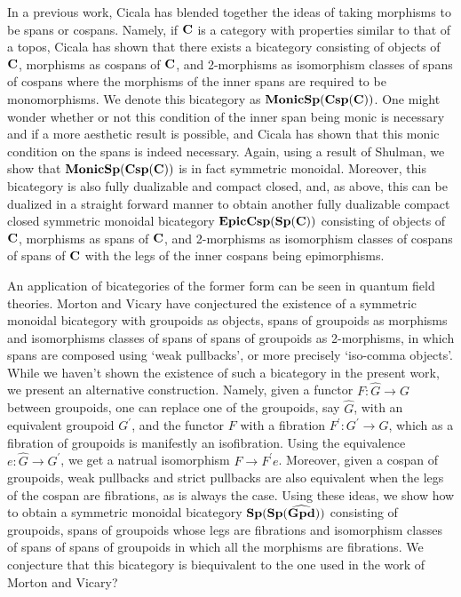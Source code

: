 \documentclass[11pt]{amsart}
\theoremstyle{remark}
\theoremstyle{definition}
\begin{document}
In a previous work, Cicala \cite{Cic} has blended together the ideas of taking morphisms to be spans or cospans. Namely, if $\bold{C}$ is a category with properties similar to that of a topos, Cicala has shown that there exists a bicategory consisting of objects of $\bold{C}$, morphisms as cospans of $\bold{C}$, and 2-morphisms as isomorphism classes of spans of cospans where the morphisms of the inner spans are required to be monomorphisms. We denote this bicategory as $\bold{MonicSp(Csp(C))}$. One might wonder whether or not this condition of the inner span being monic is necessary and if a more aesthetic result is possible, and Cicala has shown that this monic condition on the spans is indeed necessary. Again, using a result of Shulman, we show that $\bold{MonicSp(Csp(C))}$ is in fact symmetric monoidal. Moreover, this bicategory is also fully dualizable and compact closed, and, as above, this can be dualized in a straight forward manner to obtain another fully dualizable compact closed symmetric monoidal bicategory $\bold{EpicCsp(Sp(C))}$ consisting of objects of $\bold{C}$, morphisms as spans of $\bold{C}$, and 2-morphisms as isomorphism classes of cospans of spans of $\bold{C}$ with the legs of the inner cospans being epimorphisms.

An application of bicategories of the former form can be seen in quantum field theories. Morton and Vicary \cite{MortVic} have conjectured the existence of a symmetric monoidal bicategory with groupoids as objects, spans of groupoids as morphisms and isomorphisms classes of spans of spans of groupoids as 2-morphisms, in which spans are composed using `weak pullbacks', or more precisely `iso-comma objects'. While we haven't shown the existence of such a bicategory in the present work, we present an alternative construction. Namely, given a functor $F \colon \hat{G} \to G$ between groupoids, one can replace one of the groupoids, say $\hat{G}$, with an equivalent groupoid $G^\prime$, and the functor $F$ with a fibration $F^\prime \colon G^\prime \to G$, which as a fibration of groupoids is manifestly an isofibration. Using the equivalence $e \colon \hat{G} \to G^\prime$, we get a natrual isomorphism $F \to F^\prime e$. Moreover, given a cospan of groupoids, weak pullbacks and strict pullbacks are also equivalent when the legs of the cospan are fibrations, as is always the case. Using these ideas, we show how to obtain a symmetric monoidal bicategory $\bold{Sp(Sp(\widehat{Gpd}))}$ consisting of groupoids, spans of groupoids whose legs are fibrations and isomorphism classes of spans of spans of groupoids in which all the morphisms are fibrations. We conjecture that this bicategory is biequivalent to the one used in the work of Morton and Vicary?
\end{document}

